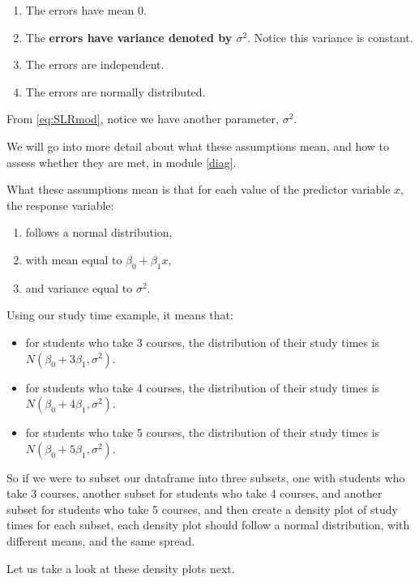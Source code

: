 \documentclass[
]{book}
\providecommand{\tightlist}{%
  \setlength{\itemsep}{0pt}\setlength{\parskip}{0pt}}
\begin{document}
\begin{enumerate}
\def\labelenumi{\arabic{enumi}.}
\tightlist
\item
  The errors have mean 0.
\item
  The \textbf{errors have variance denoted by \(\sigma^2\)}. Notice this variance is constant.
\item
  The errors are independent.
\item
  The errors are normally distributed.
\end{enumerate}

From \eqref{eq:SLRmod}, notice we have another parameter, \(\sigma^2\).

We will go into more detail about what these assumptions mean, and how to assess whether they are met, in module \ref{diag}.

What these assumptions mean is that for each value of the predictor variable \(x\), the response variable:

\begin{enumerate}
\def\labelenumi{\arabic{enumi}.}
\tightlist
\item
  follows a normal distribution,
\item
  with mean equal to \(\beta_0+\beta_{1} x\),
\item
  and variance equal to \(\sigma^2\).
\end{enumerate}

Using our study time example, it means that:

\begin{itemize}
\tightlist
\item
  for students who take 3 courses, the distribution of their study times is \(N(\beta_0 + 3\beta_1, \sigma^2)\).
\item
  for students who take 4 courses, the distribution of their study times is \(N(\beta_0 + 4\beta_1, \sigma^2)\).
\item
  for students who take 5 courses, the distribution of their study times is \(N(\beta_0 + 5\beta_1, \sigma^2)\).
\end{itemize}

So if we were to subset our dataframe into three subsets, one with students who take 3 courses, another subset for students who take 4 courses, and another subset for students who take 5 courses, and then create a density plot of study times for each subset, each density plot should follow a normal distribution, with different means, and the same spread.

Let us take a look at these density plots next.
\end{document}
